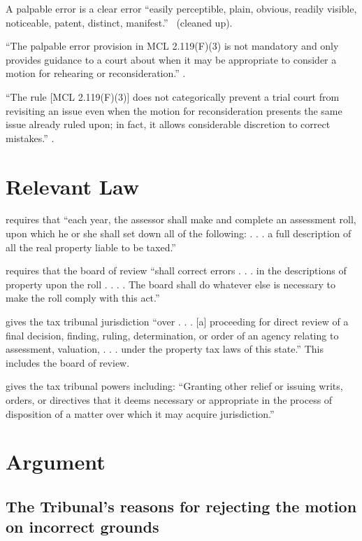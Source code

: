 \documentclass[12pt,\documentclassflag]{michiganCourtOfAppealsBrief}
\begin{document}
 A palpable error is a clear error ``easily perceptible, plain, obvious, readily
 visible, noticeable, patent, distinct, manifest.'' \ (cleaned up).
 
``The palpable error provision in MCL 2.119(F)(3)  is not mandatory and only provides guidance to
a court about when it may be appropriate to consider a motion for rehearing or reconsideration.''
.

``The rule [MCL 2.119(F)(3)] does not categorically prevent a trial court from revisiting an issue even when the motion for reconsideration presents the same issue already ruled upon; in fact, it allows considerable discretion to correct mistakes.'' . 

\section{Relevant Law}

\cite{MCL 211.24(1)} requires that ``each year, the assessor shall make and complete an assessment roll, upon which he or she shall set down all of the following: . . . a full description of all the real property liable to be taxed.''

\cite{MCL 211.29(2)} requires that the board of review ``shall correct errors . . . in the descriptions of property upon the roll . . . . The board shall do whatever else is necessary to make the roll comply with this act.''

\cite{MCL 205.731} gives the tax tribunal jurisdiction ``over . . . [a] proceeding for direct review of a final decision, finding, ruling, determination, or order of an agency relating to assessment, valuation, . . .
under the property tax laws of this state.'' This includes the board of review.

\cite{MCL 205.732(c)} gives the tax tribunal powers including: ``Granting other relief or issuing writs, orders, or directives that it deems necessary or appropriate in the process of disposition of a matter over which it may acquire jurisdiction.'' 

\section{Argument}

\subsection{The Tribunal's reasons for rejecting the motion on incorrect grounds}
\end{document}
